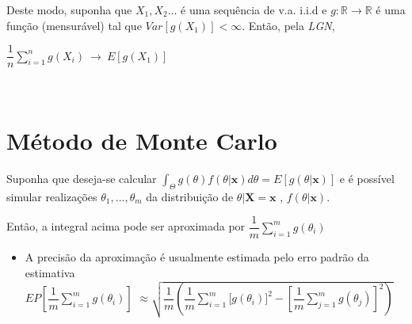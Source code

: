 \documentclass[
]{book}
\providecommand{\tightlist}{%
  \setlength{\itemsep}{0pt}\setlength{\parskip}{0pt}}
\begin{document}
Deste modo, suponha que \(X_1,X_2...\) é uma sequência de v.a. i.i.d e \(g:\mathbb{R} \longrightarrow\mathbb{R}\) é uma função (mensurável) tal que \(Var\left[g(X_1)\right]<\infty\). Então, pela \emph{LGN},

\(\dfrac{1}{n}\displaystyle \sum_{i=1}^n g(X_i) ~\longrightarrow~ E\left[g(X_1)\right]\)

\(~\)

\hypertarget{muxe9todo-de-monte-carlo}{%
\section{Método de Monte Carlo}\label{muxe9todo-de-monte-carlo}}

Suponha que deseja-se calcular \(\displaystyle\int_\Theta g(\theta)f(\theta|\boldsymbol x)d\theta=E\left[g(\theta|\boldsymbol x)\right]\) e é possível simular realizações \(\theta_1,...,\theta_m\) da distribuição de \(\theta |\boldsymbol X=\boldsymbol x\) , \(f(\theta | \boldsymbol x)\).

Então, a integral acima pode ser aproximada por \(\displaystyle \dfrac{1}{m}\sum_{i=1}^m g(\theta_i)\)

\begin{itemize}
\tightlist
\item
  A precisão da aproximação é usualmente estimada pelo erro padrão da estimativa\\
  \(\displaystyle EP\left[\dfrac{1}{m}\sum_{i=1}^m g(\theta_i)\right]\)
  \(\approx \displaystyle \sqrt{\dfrac{1}{m}\left(\dfrac{1}{m}\sum_{i=1}^m\Big[g(\theta_i)\Big]^2-\left[\dfrac{1}{m}\sum_{j=1}^mg(\theta_j)\right]^2\right)}\)
\end{itemize}

\(~\)
\end{document}
